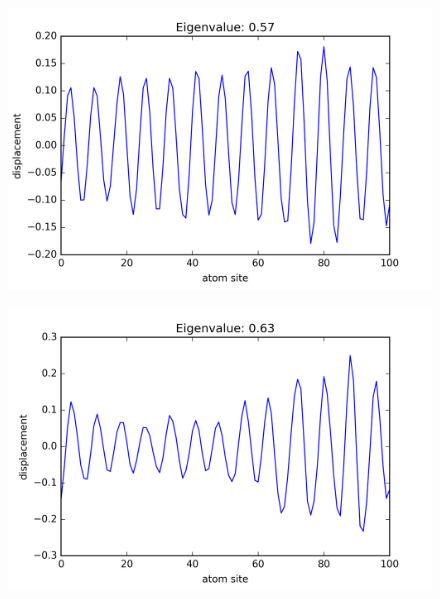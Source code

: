 \begin{figure}[!htbh]
\centering
\begin{minipage}{.45\textwidth}
  \centering
  \includegraphics[width=1.1\linewidth]{Harmonic_mass_ratio/normal_Prob_0_1N_103m_2p_26th.png}
  \label{fig:mass prob 0.1 26th}
\end{minipage}\qquad
\begin{minipage}{.45\textwidth}
  \centering
  \includegraphics[width=1.1\linewidth]{Harmonic_mass_ratio/normal_Prob_0_5N_103m_2p_26th.png}
  \label{fig:mass prob 0.5 26th}
\end{minipage}
\end{figure}


